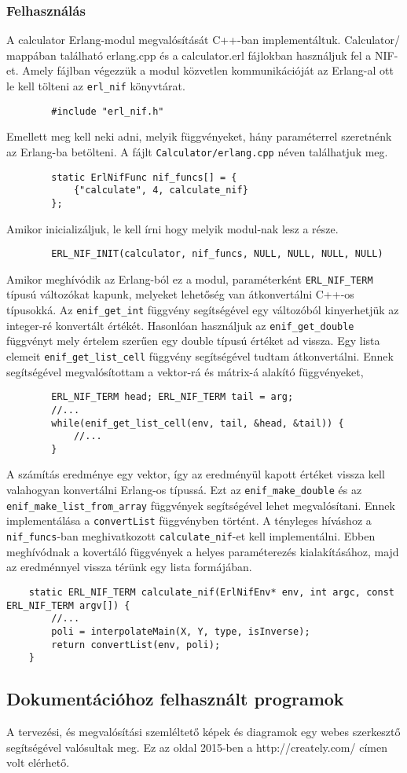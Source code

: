 	\subsubsection{Felhasználás}
	A calculator Erlang-modul megvalósítását C++-ban implementáltuk.\newline
	Calculator/ mappában található erlang.cpp és a calculator.erl fájlokban használjuk fel a NIF-et.
	Amely fájlban végezzük a modul közvetlen kommunikációját az Erlang-al ott le kell tölteni az \texttt{erl\_nif} könyvtárat.
	\begin{verbatim}
		#include "erl_nif.h"
	\end{verbatim}
	Emellett meg kell neki adni, melyik függvényeket, hány paraméterrel szeretnénk az Erlang-ba betölteni. 
	A fájlt \texttt{Calculator/erlang.cpp} néven találhatjuk meg.
	\begin{verbatim}
		static ErlNifFunc nif_funcs[] = {
		    {"calculate", 4, calculate_nif}
		};
	\end{verbatim}
	Amikor inicializáljuk, le kell írni hogy melyik modul-nak lesz a része. 
	\begin{verbatim}
		ERL_NIF_INIT(calculator, nif_funcs, NULL, NULL, NULL, NULL)
	\end{verbatim}
	Amikor meghívódik az Erlang-ból ez a modul, paraméterként \texttt{ERL\_NIF\_TERM} típusú változókat kapunk, melyeket lehetőség van átkonvertálni C++-os típusokká. \newline
	Az \texttt{enif\_get\_int} függvény segítségével egy változóból kinyerhetjük az integer-ré konvertált értékét. Hasonlóan használjuk az \texttt{enif\_get\_double} függvényt mely értelem szerűen egy double típusú értéket ad vissza.
	\newline
	Egy lista elemeit \texttt{enif\_get\_list\_cell} függvény segítségével tudtam átkonvertálni. 
	Ennek segítségével megvalósítottam a vektor-rá és mátrix-á alakító függvényeket,
	\begin{verbatim}
		ERL_NIF_TERM head; ERL_NIF_TERM tail = arg;
		//...
		while(enif_get_list_cell(env, tail, &head, &tail)) {
		    //...
		}
	\end{verbatim}
	A számítás eredménye egy vektor, így az eredményül kapott értéket vissza kell valahogyan konvertálni Erlang-os típussá. Ezt az \texttt{enif\_make\_double} és az \texttt{enif\_make\_list\_from\_array} függvények segítségével lehet megvalósítani. 
	Ennek implementálása a \texttt{convertList} függvényben történt.
	\newline
	A tényleges híváshoz a \texttt{nif\_funcs}-ban meghivatkozott \texttt{calculate\_nif}-et kell implementálni. \newline
	Ebben meghívódnak a kovertáló függvények a helyes paraméterezés kialakításához, majd az eredménnyel vissza térünk egy lista formájában.
	\begin{verbatim}
	static ERL_NIF_TERM calculate_nif(ErlNifEnv* env, int argc, const ERL_NIF_TERM argv[]) {
	    //...
	    poli = interpolateMain(X, Y, type, isInverse);
	    return convertList(env, poli);
	}
	\end{verbatim}

\subsection{Dokumentációhoz felhasznált programok}
	A tervezési, és megvalósítási szemléltető képek és diagramok egy webes szerkesztő segítségével valósultak meg. Ez az oldal 2015-ben a http://creately.com/ címen volt elérhető.